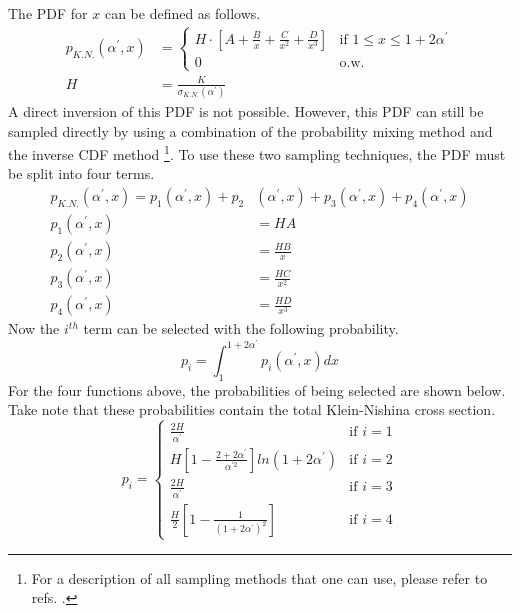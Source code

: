 The PDF for $x$ can be defined as follows.
\begin{align}
  p_{K.N.}(\alpha^{'},x) & = 
  \begin{cases}
    H \cdot \left[ A + \frac{B}{x} + \frac{C}{x^2} + \frac{D}{x^3} \right]
    & \text{if } 1 \leq x \leq 1 + 2 \alpha^{'} \\
    0 & \text{o.w.}
  \end{cases} \\
  H & = \frac{K}{\sigma_{K.N.}(\alpha^{'})} \nonumber 
\end{align}
A direct inversion of this PDF is not possible. However, this PDF can still be
sampled directly by using a combination of the probability mixing method and the
inverse CDF method \citep{koblinger_direct_1975}\footnote{For a description of 
all sampling methods that one can use, please refer to refs. \citep{koblinger_direct_1975, lux_monte_1991, spanier_monte_1969, blomquist_assessment_1983}.}. To
use these two sampling techniques, the PDF must be split into four terms. 
\begin{align}
  p_{K.N.}(\alpha^{'},x) = p_1(\alpha^{'},x) + p_2&(\alpha^{'},x) +
  p_3(\alpha^{'},x) + p_4(\alpha^{'},x) \\
  p_1(\alpha^{'},x) & = HA \nonumber \\
  p_2(\alpha^{'},x) & = \frac{HB}{x} \nonumber \\
  p_3(\alpha^{'},x) & = \frac{HC}{x^2} \nonumber \\
  p_4(\alpha^{'},x) & = \frac{HD}{x^3} \nonumber 
\end{align}
Now the $i^{th}$ term can be selected with the following probability.
\begin{equation}
  p_i = \int_1^{1+2\alpha^{'}} p_i(\alpha^{'},x) dx
\end{equation}
For the four functions above, the probabilities of being selected are shown
below. Take note that these probabilities contain the total Klein-Nishina
cross section.
\begin{equation}
  p_i = 
  \begin{cases}
    \frac{2H}{\alpha^{'}} & \text{if } i = 1 \\
    H \left[1 - \frac{2+2\alpha^{'}}{\alpha^{'2}} \right] ln(1 + 2\alpha^{'}) 
    & \text{if } i = 2 \\
    \frac{2H}{\alpha^{'}} & \text{if } i = 3 \\
    \frac{H}{2} \left[1 - \frac{1}{(1+2\alpha^{'})^2} \right] & \text{if } i = 4
    \end{cases}
\end{equation}

